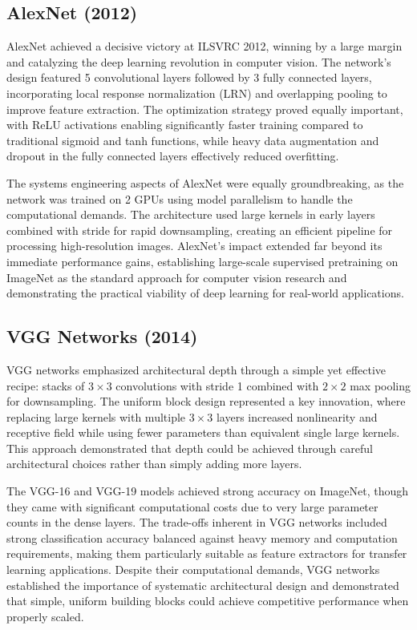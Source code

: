 \subsection{AlexNet (2012)}

AlexNet achieved a decisive victory at ILSVRC 2012, winning by a large margin and catalyzing the deep learning revolution in computer vision. The network's design featured 5 convolutional layers followed by 3 fully connected layers, incorporating local response normalization (LRN) and overlapping pooling to improve feature extraction. The optimization strategy proved equally important, with ReLU activations enabling significantly faster training compared to traditional sigmoid and tanh functions, while heavy data augmentation and dropout in the fully connected layers effectively reduced overfitting.

The systems engineering aspects of AlexNet were equally groundbreaking, as the network was trained on 2 GPUs using model parallelism to handle the computational demands. The architecture used large kernels in early layers combined with stride for rapid downsampling, creating an efficient pipeline for processing high-resolution images. AlexNet's impact extended far beyond its immediate performance gains, establishing large-scale supervised pretraining on ImageNet as the standard approach for computer vision research and demonstrating the practical viability of deep learning for real-world applications.\cite{Krizhevsky2012}

\subsection{VGG Networks (2014)}

VGG networks emphasized architectural depth through a simple yet effective recipe: stacks of $3\times3$ convolutions with stride 1 combined with $2\times2$ max pooling for downsampling. The uniform block design represented a key innovation, where replacing large kernels with multiple $3\times3$ layers increased nonlinearity and receptive field while using fewer parameters than equivalent single large kernels. This approach demonstrated that depth could be achieved through careful architectural choices rather than simply adding more layers.

The VGG-16 and VGG-19 models achieved strong accuracy on ImageNet, though they came with significant computational costs due to very large parameter counts in the dense layers. The trade-offs inherent in VGG networks included strong classification accuracy balanced against heavy memory and computation requirements, making them particularly suitable as feature extractors for transfer learning applications. Despite their computational demands, VGG networks established the importance of systematic architectural design and demonstrated that simple, uniform building blocks could achieve competitive performance when properly scaled.\cite{GoodfellowEtAl2016}

